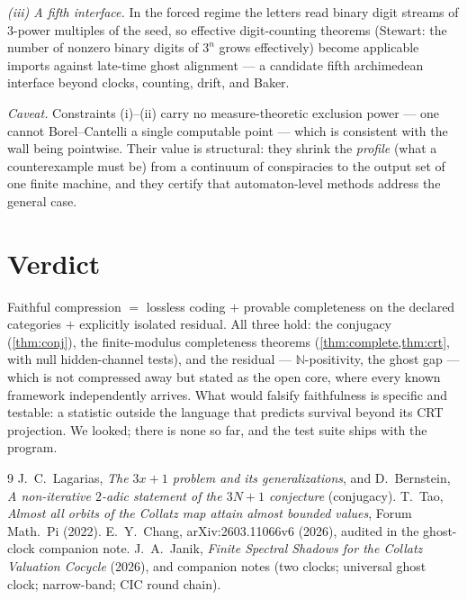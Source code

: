 \documentclass[11pt]{article}
\begin{document}
\emph{(iii) A fifth interface.} In the forced regime the letters read
binary digit streams of $3$-power multiples of the seed, so effective
digit-counting theorems (Stewart: the number of nonzero binary digits
of $3^n$ grows effectively) become applicable imports against
late-time ghost alignment --- a candidate fifth archimedean interface
beyond clocks, counting, drift, and Baker.

\emph{Caveat.} Constraints (i)--(ii) carry no measure-theoretic
exclusion power --- one cannot Borel--Cantelli a single computable
point --- which is consistent with the wall being pointwise. Their
value is structural: they shrink the \emph{profile} (what a
counterexample must be) from a continuum of conspiracies to the
output set of one finite machine, and they certify that
automaton-level methods address the general case.

\section*{Verdict}

Faithful compression $=$ lossless coding $+$ provable completeness on
the declared categories $+$ explicitly isolated residual. All three
hold: the conjugacy (\cref{thm:conj}), the finite-modulus
completeness theorems (\cref{thm:complete,thm:crt}, with null
hidden-channel tests), and the residual --- $\mathbb N$-positivity,
the ghost gap --- which is not compressed away but stated as the open
core, where every known framework independently arrives. What would
falsify faithfulness is specific and testable: a statistic outside
the language that predicts survival beyond its CRT projection. We
looked; there is none so far, and the test suite ships with the
program.

\begin{thebibliography}{9}
 J.~C.~Lagarias, \emph{The $3x+1$ problem and its
generalizations}, and D.~Bernstein, \emph{A non-iterative
$2$-adic statement of the $3N+1$ conjecture} (conjugacy).
 T.~Tao, \emph{Almost all orbits of the Collatz map
attain almost bounded values}, Forum Math.\ Pi (2022).
 E.~Y.~Chang, arXiv:2603.11066v6 (2026), audited in
the ghost-clock companion note.
 J.~A.~Janik, \emph{Finite Spectral Shadows for the
Collatz Valuation Cocycle} (2026), and companion notes (two clocks;
universal ghost clock; narrow-band; CIC round chain).
\end{thebibliography}
\end{document}
